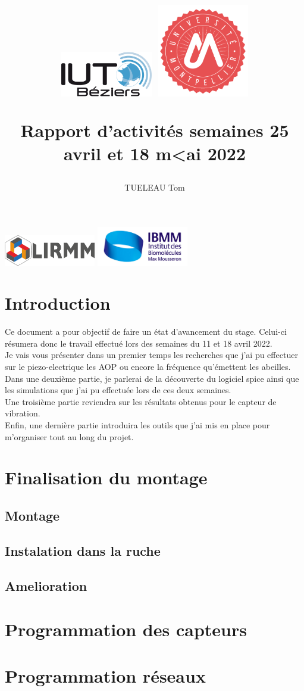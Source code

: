 \documentclass[11pt,french,a4paper]{article}
\title{
 \centering
         \includegraphics[width=4cm]{../../../logo/IUTlogo.png}  \hspace{7cm}
         \includegraphics[width=4cm]{../../../logo/UMlogo.png}  \hspace{7cm}
    
	\LARGE{Rapport d'activités semaines 25 avril et 18 m<ai 2022 }
	\author{TUELEAU Tom}
}
\author{
	\date{}
}
\begin{document}
\maketitle
	 \includegraphics[width=4cm]{../../../logo/LIRMMlogo.png}  \hspace{7cm}
         \includegraphics[width=4cm]{../../../logo/IBMMlogo.jpg}  \hspace{7cm}
\newpage
\tableofcontents
\newpage
\section{Introduction}
Ce document a pour objectif de faire un état d'avancement du stage. Celui-ci résumera donc le travail effectué lors des semaines du 11 et 18 avril 2022.
\\Je vais vous présenter dans un premier temps les recherches que j'ai pu effectuer sur le piezo-electrique les AOP ou encore la fréquence qu'émettent les abeilles. 
\\Dans une deuxième partie, je parlerai de la découverte du logiciel spice ainsi que les simulations que j'ai pu effectuée lors de ces deux semaines.
\\Une troisième partie reviendra sur les résultats obtenus pour le capteur de vibration. 
\\Enfin, une dernière partie introduira les outils que j'ai mis en place pour m'organiser tout au long du projet. 
\section{Finalisation du montage}
\subsection{Montage}
\subsection{Instalation dans la ruche}
\subsection{Amelioration}
\section{Programmation des capteurs}
\section{Programmation réseaux}

\newpage
\listoffigures
\end{document}

